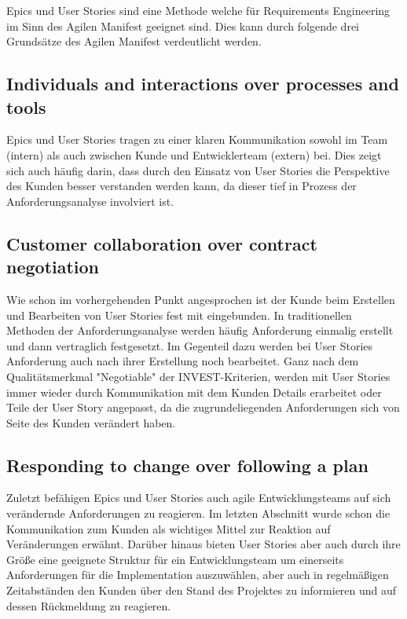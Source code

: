\documentclass[acmtog]{acmart}
\begin{document}

Epics und User Stories sind eine Methode welche für Requirements Engineering im Sinn des Agilen Manifest \cite{agile_manifesto_2001} geeignet sind.
Dies kann durch folgende drei Grundsätze des Agilen Manifest verdeutlicht werden.

\subsection{Individuals and interactions over processes and tools}
Epics und User Stories tragen zu einer klaren Kommunikation sowohl im Team (intern) als auch zwischen Kunde und Entwicklerteam (extern) bei.
Dies zeigt sich auch häufig darin, dass durch den Einsatz von User Stories die Perspektive des Kunden besser verstanden werden kann,
da dieser tief in Prozess der Anforderungsanalyse involviert ist.

\subsection{Customer collaboration over contract negotiation}
Wie schon im vorhergehenden Punkt angesprochen ist der Kunde beim Erstellen und Bearbeiten von User Stories fest mit eingebunden.
In traditionellen Methoden der Anforderungsanalyse werden häufig Anforderung einmalig erstellt und dann vertraglich festgesetzt.
Im Gegenteil dazu werden bei User Stories Anforderung auch nach ihrer Erstellung noch bearbeitet.
Ganz nach dem Qualitätsmerkmal "Negotiable" der INVEST-Kriterien, werden mit User Stories
immer wieder durch Kommunikation mit dem Kunden Details erarbeitet oder Teile der User Story angepasst, da die zugrundeliegenden
Anforderungen sich von Seite des Kunden verändert haben.

\subsection{Responding to change over following a plan}
Zuletzt befähigen Epics und User Stories auch agile Entwicklungsteams auf sich verändernde Anforderungen zu reagieren.
Im letzten Abschnitt wurde schon die Kommunikation zum Kunden als wichtiges Mittel zur Reaktion auf Veränderungen erwähnt.
Darüber hinaus bieten User Stories aber auch durch ihre Größe eine geeignete Struktur für ein Entwicklungsteam um einerseits
Anforderungen für die Implementation auszuwählen, aber auch in regelmäßigen Zeitabständen den Kunden über den
Stand des Projektes zu informieren und auf dessen Rückmeldung zu reagieren.
\end{document}
